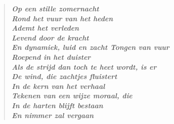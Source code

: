 






\newpage
\tableofcontents                                                

\newpage
{}
\begin{verse}
\it{\bf{O}p een stille zomernacht\\
    \bf{R}ond het vuur van het heden\\
    \bf{A}demt het verleden\\
    \bf{L}evend door de kracht\\
    \bf{E}n dynamiek, luid en zacht
\vl
    \bf{T}ongen van vuur\\
    \bf{R}oepend in het duister\\
    \bf{A}ls de strijd dan toch te heet wordt, is er\\
    \bf{D}e wind, die zachtjes fluistert\\
    \bf{I}n de kern van het verhaal\\
    \bf{T}ekenen van een wijze moraal, die\\
    \bf{I}n de harten blijft bestaan\\
    \bf{E}n nimmer zal vergaan}
\end{verse}


